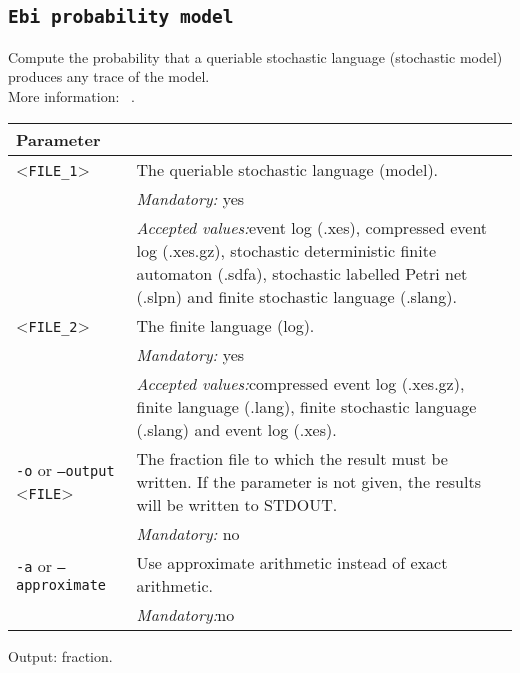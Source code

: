 {\subsection{\texttt{Ebi probability model}}
Compute the probability that a queriable stochastic language (stochastic model) produces any trace of the model.\\
More information: ~\cite{DBLP:journals/is/LeemansMM24}.\\
\begin{tabularx}{\linewidth}{lX}
\toprule
Parameter \\\midrule
<\texttt{FILE\_1}>&The queriable stochastic language (model).\\
&\textit{Mandatory:} \quad yes\\
&\textit{Accepted values:}\quad event log (.xes), compressed event log (.xes.gz), stochastic deterministic finite automaton (.sdfa), stochastic labelled Petri net (.slpn) and finite stochastic language (.slang).\\
<\texttt{FILE\_2}>&The finite language (log).\\
&\textit{Mandatory:} \quad yes\\
&\textit{Accepted values:}\quad compressed event log (.xes.gz), finite language (.lang), finite stochastic language (.slang) and event log (.xes).\\
\texttt{-o} or \texttt{--output} <\texttt{FILE}> &
The fraction file to which the result must be written. If the parameter is not given, the results will be written to STDOUT.\\
&\textit{Mandatory:} \quad no\\
\texttt{-a} or \texttt{--approximate} & Use approximate arithmetic instead of exact arithmetic.\\
&\textit{Mandatory:}\quad no\\
\bottomrule
\end{tabularx}
Output: fraction.
}
